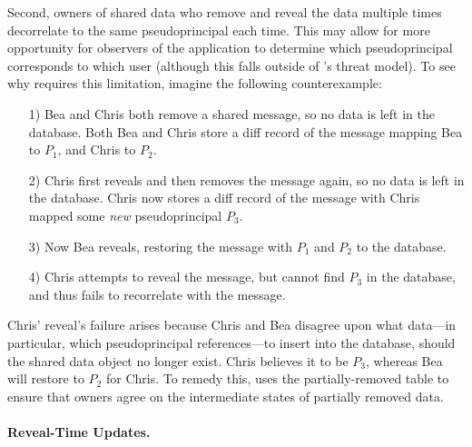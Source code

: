 Second, owners of shared data who remove and reveal the data multiple times 
decorrelate to the same pseudoprincipal each time. This may allow for more opportunity
for observers of the application to determine which pseudoprincipal corresponds
to which user (although this falls outside of \sys's threat model).
To see why \sys requires this limitation, imagine the following counterexample:
\begin{enumerate}
    \item[1)] Bea and Chris both remove a shared message, so no data is left in
        the database. Both Bea and Chris store a diff record of the message mapping Bea to $P_1$,
        and Chris to $P_2$. 
       
    \item[2)] Chris first reveals and then removes the message again, so no data
        is left in the database. Chris now stores a diff record of the message
        with Chris mapped some \emph{new} pseudoprincipal $P_3$.
        
    \item[3)] Now Bea reveals, restoring the message with $P_1$ and $P_2$ to
        the database. 
        
    \item[4)] Chris attempts to reveal the message, but cannot find $P_3$ in the
        database, and thus fails to recorrelate with the message. 
\end{enumerate}
%
Chris' reveal's failure arises because Chris and Bea disagree upon what
data---in particular, which pseudoprincipal references---to insert into the
database, should the shared data object no longer exist. Chris believes it to be
$P_3$, whereas Bea will restore to $P_2$ for Chris. 
To remedy this, \sys uses the partially-removed table to ensure that owners
agree on the intermediate states of partially removed data.
%



\paragraph{Reveal-Time Updates.}
\label{s:design:updates:limitations}
%
%

